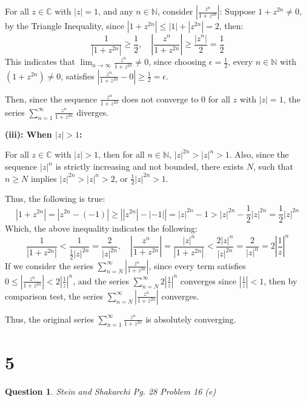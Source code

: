 \documentclass{article}
\newtheorem{question}{Question}
\begin{document}
For all $z\in\mathbb{C}$ with $|z|=1$, and any $n\in\mathbb{N}$, consider $\left|\frac{z^n}{1+z^{2n}}\right|$:
Suppose $1+z^{2n}\neq 0$, by the Triangle Inequality, since $|1+z^{2n}| \leq |1|+|z^{2n}|=2$, then:
$$\frac{1}{|1+z^{2n}|} \geq \frac{1}{2},\quad \left|\frac{z^n}{1+z^{2n}}\right|\geq\frac{|z^n|}{2}=\frac{1}{2}$$
This indicates that $\lim_{n\rightarrow\infty}\frac{z^n}{1+z^{2n}}\neq 0$, since choosing $\epsilon=\frac{1}{2}$, every $n\in\mathbb{N}$ with $(1+z^{2n})\neq 0$,
satisfies $\left|\frac{z^n}{1+z^{2n}}-0\right|\geq \frac{1}{2}=\epsilon$. 

Then, since the sequence $\frac{z^n}{1+z^{2n}}$ does not converge to $0$ for all $z$ with $|z|=1$, the series $\sum_{n=1}^{\infty}\frac{z^n}{1+z^{2n}}$ diverges.

\hfill

\hfill

\textbf{(iii): When $|z|>1$:}

For all $z\in\mathbb{C}$ with $|z|>1$, then for all $n\in\mathbb{N}$, $|z|^{2n}>|z|^n>1$. Also, since the sequence $|z|^n$ is strictly increasing and not bounded, there exists $N$, such that $n\geq N$ implies $|z|^{2n}>|z|^n>2$, or $\frac{1}{2}|z|^{2n}>1$.

Thus, the following is true:
$$|1+z^{2n}|=|z^{2n}-(-1)|\geq \left||z^{2n}|-|-1|\right| = |z|^{2n}-1 >|z|^{2n}-\frac{1}{2}|z|^{2n}=\frac{1}{2}|z|^{2n}$$
Which, the above inequality indicates the following:
$$\frac{1}{|1+z^{2n}|}<\frac{1}{\frac{1}{2}|z|^{2n}}=\frac{2}{|z|^{2n}},\quad \left|\frac{z^n}{1+z^{2n}}\right|=\frac{|z|^n}{|1+z^{2n}|}<\frac{2|z|^n}{|z|^{2n}} = \frac{2}{|z|^n} = 2\left|\frac{1}{z}\right|^n$$
If we consider the series $\sum_{n=N}^{\infty}\left|\frac{z^n}{1+z^{2n}}\right|$, since every term satisfies $0\leq \left|\frac{z^n}{1+z^{2n}}\right|<2\left|\frac{1}{z}\right|^n$, and the series $\sum_{n=N}^{\infty}2\left|\frac{1}{z}\right|^n$ converges since $\left|\frac{1}{z}\right|<1$, then by comparison test, the series $\sum_{n=N}^{\infty}\left|\frac{z^n}{1+z^{2n}}\right|$ converges.

Thus, the original series $\sum_{n=1}^{\infty}\frac{z^n}{1+z^{2n}}$ is absolutely converging.

\break

\section*{5}
\begin{question}
    Stein and Shakarchi Pg. 28 Problem 16 (e)
\end{question}
\end{document}
